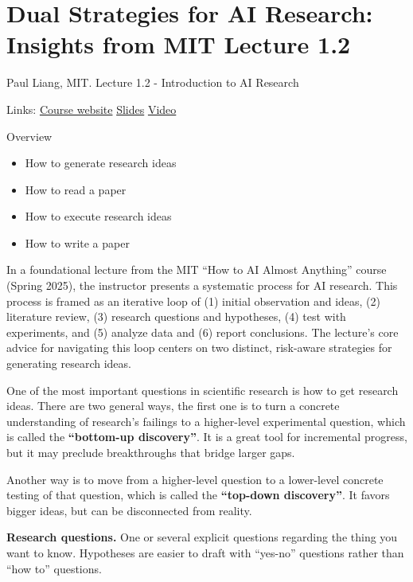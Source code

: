 
\section{Dual Strategies for AI Research: Insights from MIT Lecture 1.2}
\label{sec:dual_strategies}

Paul Liang, MIT. Lecture 1.2 - Introduction to AI Research

Links:
\href{https://mit-mi.github.io/how2ai-course/spring2025/}{Course website}
\href{https://mit-mi.github.io/how2ai-course/spring2025/schedule/lec1.2\%20-\%20AI\%20research.pdf}{Slides}
\href{https://www.youtube.com/watch?v=104FX8MYKAM}{Video}

Overview
\begin{itemize}
    \item How to generate research ideas
    \item How to read a paper
    \item How to execute research ideas
    \item How to write a paper
\end{itemize}

In a foundational lecture from the MIT ``How to AI Almost Anything'' course (Spring 2025), the instructor presents a systematic process for AI research.
This process is framed as an iterative loop of (1) initial observation and ideas, (2) literature review, (3) research questions and hypotheses, (4) test with experiments, and (5) analyze data and (6) report conclusions.
The lecture's core advice for navigating this loop centers on two distinct, risk-aware strategies for generating research ideas.

One of the most important questions in scientific research is how to get research ideas.
There are two general ways, the first one is to turn a concrete understanding of research's failings to a higher-level experimental question, which is called the \textbf{``bottom-up discovery''}.
It is a great tool for incremental progress, but it may preclude breakthroughs that bridge larger gaps.

Another way is to move from a higher-level question to a lower-level concrete testing of that question, which is called the \textbf{``top-down discovery''}.
It favors bigger ideas, but can be disconnected from reality.

\textbf{Research questions.} One or several explicit questions regarding the thing you want to know.
Hypotheses are easier to draft with ``yes-no'' questions rather than ``how to'' questions.


